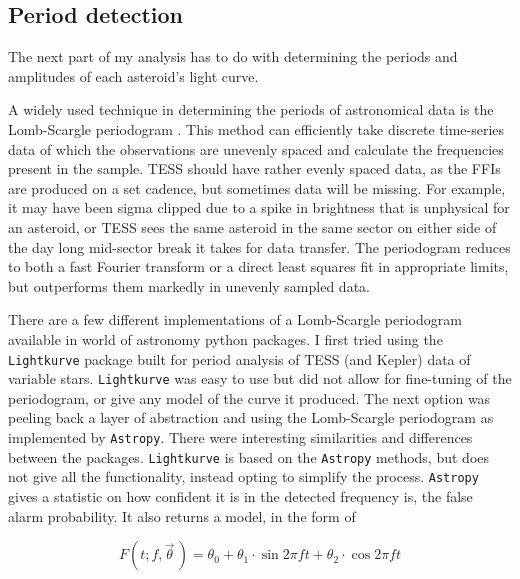 \documentclass{UCreport}
\begin{document}
\subsection{Period detection}\label{SubSec:Periods}


The next part of my analysis has to do with determining the periods and amplitudes of each asteroid's light curve.

A widely used technique in determining the periods of astronomical data is the Lomb-Scargle periodogram \citep[\citet{Lomb1976,Scargle1982}, but see][for a review]{VanderPlas2018}.
This method can efficiently take discrete time-series data of which the observations are unevenly spaced and calculate the frequencies present in the sample.
TESS should have rather evenly spaced data, as the FFIs are produced on a set cadence, but sometimes data will be missing.
For example, it may have been sigma clipped due to a spike in brightness that is unphysical for an asteroid, or TESS sees the same asteroid in the same sector on either side of the day long mid-sector break it takes for data transfer.
The periodogram reduces to both a fast Fourier transform or a direct least squares fit in appropriate limits, but outperforms them markedly in unevenly sampled data.

There are a few different implementations of a Lomb-Scargle periodogram available in world of astronomy python packages.
I first tried using the \texttt{Lightkurve} \citep{Lightkurve2018} package built for period analysis of TESS (and Kepler) data of variable stars.
\texttt{Lightkurve} was easy to use but did not allow for fine-tuning of the periodogram, or give any model of the curve it produced.
The next option was peeling back a layer of abstraction and using the Lomb-Scargle periodogram as implemented by \texttt{Astropy}\citep[\citet{Astropy2022} but see][for the implementation]{Vanderplas2012,Vanderplas2015}.
There were interesting similarities and differences between the packages.
\texttt{Lightkurve} is based on the \texttt{Astropy} methods, but does not give all the functionality, instead opting to simplify the process.
\texttt{Astropy} gives a statistic on how confident it is in the detected frequency is, the false alarm probability.
It also returns a model, in the form of

\begin{equation}
  \label{Eq:LCModel}
  F(t;f,\vec{\theta}\,) = \theta_0 + \theta_1\cdot\sin{2\pi ft} +\theta_2\cdot\cos{2\pi ft}
\end{equation}
\end{document}
